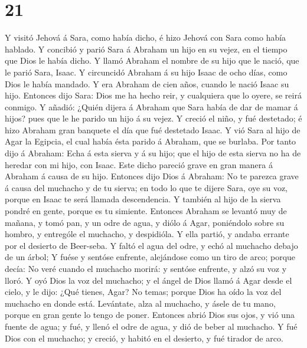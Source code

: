 \hypertarget{section-20}{%
\section{21}\label{section-20}}

 Y visitó Jehová á Sara, como había dicho, é hizo Jehová con
Sara como había hablado.  Y concibió y parió Sara á Abraham
un hijo en su vejez, en el tiempo que Dios le había dicho. 
Y llamó Abraham el nombre de su hijo que le nació, que le parió Sara,
Isaac.  Y circuncidó Abraham á su hijo Isaac de ocho días,
como Dios le había mandado.  Y era Abraham de cien años,
cuando le nació Isaac su hijo.  Entonces dijo Sara: Dios me
ha hecho reir, y cualquiera que lo oyere, se reirá conmigo. 
Y añadió: ¿Quién dijera á Abraham que Sara había de dar de mamar á
hijos? pues que le he parido un hijo á su vejez.  Y creció
el niño, y fué destetado; é hizo Abraham gran banquete el día que fué
destetado Isaac.  Y vió Sara al hijo de Agar la Egipcia, el
cual había ésta parido á Abraham, que se burlaba.  Por
tanto dijo á Abraham: Echa á esta sierva y á su hijo; que el hijo de
esta sierva no ha de heredar con mi hijo, con Isaac.  Este
dicho pareció grave en gran manera á Abraham á causa de su hijo.
 Entonces dijo Dios á Abraham: No te parezca grave á causa
del muchacho y de tu sierva; en todo lo que te dijere Sara, oye su voz,
porque en Isaac te será llamada descendencia.  Y también al
hijo de la sierva pondré en gente, porque es tu simiente. 
Entonces Abraham se levantó muy de mañana, y tomó pan, y un odre de
agua, y diólo á Agar, poniéndolo sobre su hombro, y entrególe el
muchacho, y despidióla. Y ella partió, y andaba errante por el desierto
de Beer-seba.  Y faltó el agua del odre, y echó al muchacho
debajo de un árbol;  Y fuése y sentóse enfrente, alejándose
como un tiro de arco; porque decía: No veré cuando el muchacho morirá: y
sentóse enfrente, y alzó su voz y lloró.  Y oyó Dios la voz
del muchacho; y el ángel de Dios llamó á Agar desde el cielo, y le dijo:
¿Qué tienes, Agar? No temas; porque Dios ha oído la voz del muchacho en
donde está.  Levántate, alza al muchacho, y ásele de tu
mano, porque en gran gente lo tengo de poner.  Entonces
abrió Dios sus ojos, y vió una fuente de agua; y fué, y llenó el odre de
agua, y dió de beber al muchacho.  Y fué Dios con el
muchacho; y creció, y habitó en el desierto, y fué tirador de arco.
